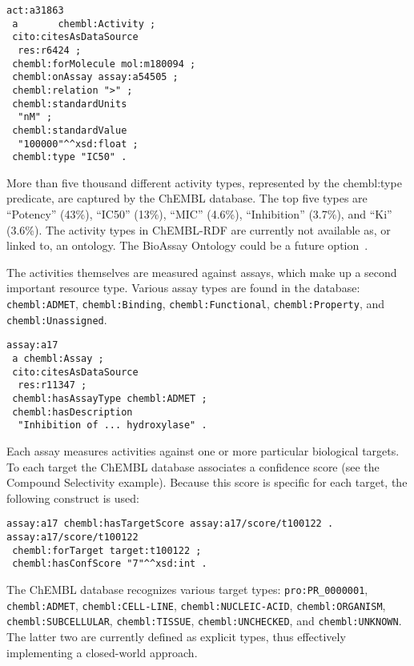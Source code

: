 \documentclass[10pt]{bmc_article}
\newenvironment{bmcformat}{\begin{raggedright}\baselineskip20pt\sloppy\setboolean{publ}{false}}{\end{raggedright}\baselineskip20pt\sloppy}
\begin{document}
\begin{bmcformat}
\begin{small}
\begin{verbatim}
act:a31863
 a       chembl:Activity ;
 cito:citesAsDataSource
  res:r6424 ;
 chembl:forMolecule mol:m180094 ;
 chembl:onAssay assay:a54505 ;
 chembl:relation ">" ;
 chembl:standardUnits
  "nM" ;
 chembl:standardValue
  "100000"^^xsd:float ;
 chembl:type "IC50" .
\end{verbatim}
\end{small}

More than five thousand different activity types, represented by the chembl:type predicate,
are captured by the ChEMBL database.
The top five types are ``Potency'' (43\%), ``IC50'' (13\%), ``MIC'' (4.6\%), ``Inhibition'' (3.7\%),
and ``Ki'' (3.6\%). The activity types in ChEMBL-RDF are currently not available as, or
linked to, an ontology. The BioAssay Ontology could be a future option~\cite{Visser2011}.

The activities themselves are measured against assays, which make up a second important
resource type. Various assay types are found in the database: \verb+chembl:ADMET+, \verb+chembl:Binding+,
\verb+chembl:Functional+, \verb+chembl:Property+, and \verb+chembl:Unassigned+.

\begin{small}
\begin{verbatim}
assay:a17
 a chembl:Assay ;
 cito:citesAsDataSource
  res:r11347 ;
 chembl:hasAssayType chembl:ADMET ;
 chembl:hasDescription
  "Inhibition of ... hydroxylase" .
\end{verbatim}
\end{small}

Each assay measures activities against one or more particular biological targets. To each
target the ChEMBL database associates a confidence score (see the Compound Selectivity
example). Because this score is specific
for each target, the following construct is used:

\begin{small}
\begin{verbatim}
assay:a17 chembl:hasTargetScore assay:a17/score/t100122 .
assay:a17/score/t100122
 chembl:forTarget target:t100122 ;
 chembl:hasConfScore "7"^^xsd:int .  
\end{verbatim}
\end{small}

The ChEMBL database
recognizes various target types: \verb+pro:PR_0000001+, \verb+chembl:ADMET+, \verb+chembl:CELL-LINE+,
\verb+chembl:NUCLEIC-ACID+, \verb+chembl:ORGANISM+, \verb+chembl:SUBCELLULAR+, \verb+chembl:TISSUE+,
\verb+chembl:UNCHECKED+, and \verb+chembl:UNKNOWN+. The latter two are currently defined as
explicit types, thus effectively implementing a closed-world approach. 


\end{bmcformat}
\end{document}
